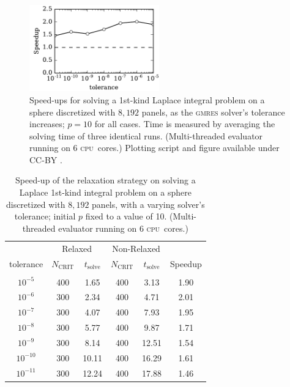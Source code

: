 \documentclass[final,3p,times]{elsarticle}
\newcommand{\cpu}{\textsc{cpu}}
\newcommand{\ncrit}{N_{\text{CRIT}}}
\newcommand{\tsolve}{t_{\text{solve}}}
\newcommand{\gmres}{\textsc{gmres}\xspace}
\begin{document}
\begin{figure}%
	\centering
	\includegraphics[natwidth=3in,natheight=2in,width=0.5\textwidth]{LaplaceSpeedupTolerance.pdf}
	\caption{Speed-ups for solving a 1st-kind Laplace integral problem on a sphere discretized with $8,192$ panels, as the \gmres solver's tolerance increases; $p=10$ for all cases. Time is measured by averaging the solving time of three identical runs. (Multi-threaded evaluator running on 6 \cpu\ cores.) Plotting script and figure available under CC-BY \cite{WangLaytonBarba2016-figshare2}.}
	\label{fig:laplace_tolerance_speedup}
\end{figure}


\begin{table}[h]
\footnotesize
\begin{center}
\begin{tabular}{c|cc|cc|c}
  & \multicolumn{2}{c|}{Relaxed} & \multicolumn{2}{c|}{Non-Relaxed} & \\
  tolerance & $\ncrit$ & $\tsolve$ & $\ncrit$ & $\tsolve$ & Speedup \\
 \hline
   & & & & & \\
  $10^{-5} $ & 400 & 1.65 & 400 & 3.13 & 1.90 \\
  $10^{-6} $ & 300 & 2.34 & 400 & 4.71 & 2.01 \\
  $10^{-7} $ & 300 & 4.07 & 400 & 7.93 & 1.95 \\
  $10^{-8} $ & 300 & 5.77 & 400 & 9.87 & 1.71 \\
  $10^{-9} $ & 300 & 8.14 & 400 & 12.51 & 1.54 \\
  $10^{-10} $ & 300 & 10.11 & 400 & 16.29 & 1.61 \\
  $10^{-11} $ & 300 & 12.24 & 400 & 17.88 & 1.46 \\
\end{tabular}
\end{center}
\caption{Speed-up of the relaxation strategy on solving a Laplace 1st-kind integral problem on a sphere discretized with $8,192$ panels, with a varying solver's tolerance; initial $p$ fixed to a value of 10. (Multi-threaded evaluator running on 6 \cpu\ cores.)}
\label{tab:laplace_1st_tolerance_relaxation}
\end{table}%
\end{document}
